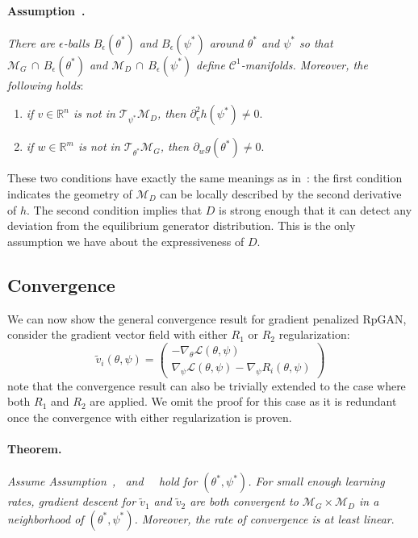 \paragraph{Assumption~.}
\label{a:3}
\emph{There are $\epsilon$-balls $B_\epsilon(\theta^*)$ and $B_\epsilon(\psi^*)$ around $\theta^*$ and $\psi^*$ so that $\mathcal{M}_G\,\cap\,B_\epsilon(\theta^*)$ and $\mathcal{M}_D\,\cap\,B_\epsilon(\psi^*)$ define $\mathcal{C}^1$-manifolds. Moreover, the following holds}:
\begin{enumerate}[label=(\roman*)]
\item \emph{if $v\in\mathbb{R}^n$ is not in $\mathcal{T}_{\psi^*}\mathcal{M}_D$, then $\partial_v^2h(\psi^*)\neq0$}.
\item \emph{if $w\in\mathbb{R}^m$ is not in $\mathcal{T}_{\theta^*}\mathcal{M}_G$, then $\partial_wg(\theta^*)\neq0$}.
\end{enumerate}

These two conditions have exactly the same meanings as in~\cite{r1}: the first condition indicates the geometry of $\mathcal{M}_D$ can be locally described by the second derivative of $h$. The second condition implies that $D$ is strong enough that it can detect any deviation from the equilibrium generator distribution. This is the only assumption we have about the expressiveness of $D$.

\subsection{Convergence}
We can now show the general convergence result for gradient penalized RpGAN, consider the gradient vector field with either $R_1$ or $R_2$ regularization:
\begin{equation}
\label{eq:vreg}
\tilde{v}_i(\theta,\psi)=\begin{pmatrix}
-\nabla_\theta\mathcal{L}(\theta,\psi)\\ 
\nabla_\psi\mathcal{L}(\theta,\psi)-\nabla_\psi R_i(\theta,\psi)
\end{pmatrix}
\end{equation}
note that the convergence result can also be trivially extended to the case where both $R_1$ and $R_2$ are applied. We omit the proof for this case as it is redundant once the convergence with either regularization is proven.

\paragraph{Theorem.} \emph{Assume Assumption~,~ and~~ hold for $(\theta^*,\psi^*)$. For small enough learning rates, gradient descent for $\tilde{v}_1$ and $\tilde{v}_2$ are both convergent to $\mathcal{M}_G\times\mathcal{M}_D$ in a neighborhood of $(\theta^*,\psi^*)$. Moreover, the rate of convergence is at least linear}.

